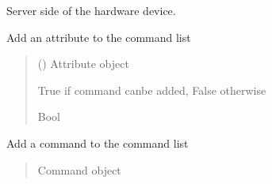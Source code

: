 \documentclass[letterpaper,10pt,english]{sphinxmanual}
\begin{document}
\begin{fulllineitems}
\label{\detokenize{webserverdocs:HardwareBaseClass.HardwareBaseDevice}}
\pysigstartsignatures
{}
\pysigstopsignatures
\sphinxAtStartPar
Server side of the hardware device.

\begin{fulllineitems}
\label{\detokenize{webserverdocs:HardwareBaseClass.HardwareBaseDevice.add_attribute}}
\pysigstartsignatures
{}
\pysigstopsignatures
\sphinxAtStartPar
Add an attribute to the command list
\begin{quote}\begin{description}
\sphinxAtStartPar
{} () \textendash{} Attribute object

\sphinxAtStartPar
True if command canbe added, False otherwise

\sphinxAtStartPar
Bool

\end{description}\end{quote}

\end{fulllineitems}


\begin{fulllineitems}
\label{\detokenize{webserverdocs:HardwareBaseClass.HardwareBaseDevice.add_command}}
\pysigstartsignatures
{}
\pysigstopsignatures
\sphinxAtStartPar
Add a command to the command list
\begin{quote}\begin{description}
\sphinxAtStartPar
{} \textendash{} Command object


\end{description}
\end{quote}
\end{fulllineitems}
\end{fulllineitems}
\end{document}
